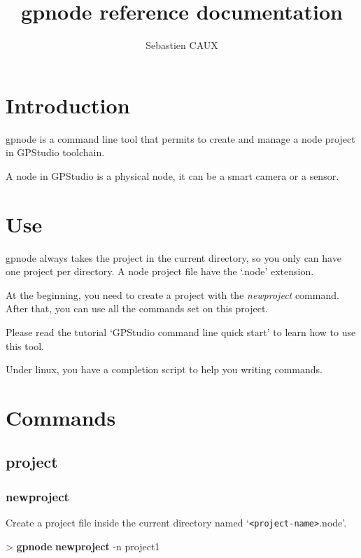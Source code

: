 \documentclass[10pt,a4paper]{article}
\author{Sebastien CAUX}
\title{gpnode reference documentation \version}
\begin{document}
\maketitle
\section{Introduction}
gpnode is a command line tool that permits to create and manage a node project in GPStudio toolchain.

A node in GPStudio is a physical node, it can be a smart camera or a sensor.

\section{Use}
gpnode always takes the project in the current directory, so you only can have one project per directory. A node project file have the `.node' extension.

At the beginning, you need to create a project with the \emph{newproject} command. After that, you can use all the commands set on this project.

Please read the tutorial `GPStudio command line quick start' to learn how to use this tool.

Under linux, you have a completion script to help you writing commands.

\section{Commands}
\subsection{project}
\subsubsection{newproject}

Create a project file inside the current directory named `\texttt{<project-name>}.node'.\\


\begin{sampletitle}
> \textbf{gpnode} \textbf{newproject} -n project1
\end{sampletitle}
\end{document}
